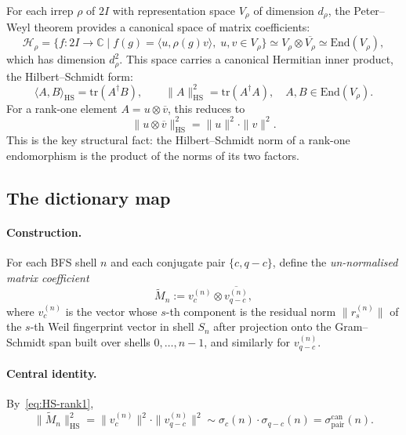 \documentclass[12pt,a4paper]{article}
\theoremstyle{definition}
\theoremstyle{remark}
\begin{document}
    For each irrep $\rho$ of $2I$ with representation space $V_\rho$ of dimension
    $d_\rho$, the Peter--Weyl theorem provides a canonical space of matrix coefficients:
    \begin{equation}
      \mathcal{H}_\rho
      = \{f : 2I \to \mathbb{C} \mid f(g) = \langle u, \rho(g) v \rangle,\;
      u, v \in V_\rho\}
      \simeq V_\rho \otimes \overline{V_\rho}
      \simeq \mathrm{End}(V_\rho),
    \end{equation}
    which has dimension $d_\rho^2$.
    This space carries a canonical Hermitian inner product, the Hilbert--Schmidt form:
    \begin{equation}
      \langle A, B \rangle_{\mathrm{HS}} = \mathrm{tr}(A^\dagger B),
      \qquad \|A\|_{\mathrm{HS}}^2 = \mathrm{tr}(A^\dagger A),
      \quad A, B \in \mathrm{End}(V_\rho).
      \label{eq:HS-form}
    \end{equation}
    For a rank-one element $A = u \otimes \overline{v}$, this reduces to
    \begin{equation}
      \|u \otimes \overline{v}\|_{\mathrm{HS}}^2 = \|u\|^2 \cdot \|v\|^2.
      \label{eq:HS-rank1}
    \end{equation}
    This is the key structural fact: the Hilbert--Schmidt norm of a rank-one
    endomorphism is the product of the norms of its two factors.

  \subsection{The dictionary map}
    \label{sec:dict-map}

    \paragraph{Construction.}
      For each BFS shell $n$ and each conjugate pair $\{c, q-c\}$, define the
      \emph{un-normalised matrix coefficient}
      \begin{equation}
        \widetilde{M}_n := v_c^{(n)} \otimes \overline{v_{q-c}^{(n)}},
        \label{eq:Mn-unnorm}
      \end{equation}
      where $v_c^{(n)}$ is the vector whose $s$-th component is the residual norm
      $\|r_s^{(n)}\|$ of the $s$-th Weil fingerprint vector in shell $S_n$ after
      projection onto the Gram--Schmidt span built over shells $0, \ldots, n-1$,
      and similarly for $v_{q-c}^{(n)}$.

    \paragraph{Central identity.}
      By~\eqref{eq:HS-rank1},
      \begin{equation}
        \|\widetilde{M}_n\|_{\mathrm{HS}}^2
        = \|v_c^{(n)}\|^2 \cdot \|v_{q-c}^{(n)}\|^2
        \sim \sigma_c(n) \cdot \sigma_{q-c}(n)
        = \sigma^{\mathrm{can}}_{\mathrm{pair}}(n).
        \label{eq:identity}
      \end{equation}
\end{document}

